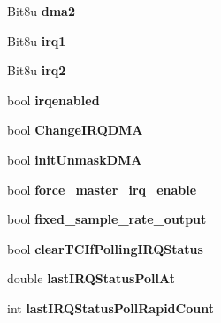 \begin{DoxyCompactItemize}
\item 
\hypertarget{structGFGus_a2c5b80f3d718d473666275ca05426004}{Bit8u {\bfseries dma2}}\label{structGFGus_a2c5b80f3d718d473666275ca05426004}

\item 
\hypertarget{structGFGus_a77dbee069455b135eb03cb0506ca7183}{Bit8u {\bfseries irq1}}\label{structGFGus_a77dbee069455b135eb03cb0506ca7183}

\item 
\hypertarget{structGFGus_aee8e865cfc001eee4b684a9f0aaf13c2}{Bit8u {\bfseries irq2}}\label{structGFGus_aee8e865cfc001eee4b684a9f0aaf13c2}

\item 
\hypertarget{structGFGus_a880603316b40656dcd6a0a66b31de0e1}{bool {\bfseries irqenabled}}\label{structGFGus_a880603316b40656dcd6a0a66b31de0e1}

\item 
\hypertarget{structGFGus_a886bb283bcdd3fed729cc9d0a227e215}{bool {\bfseries Change\-I\-R\-Q\-D\-M\-A}}\label{structGFGus_a886bb283bcdd3fed729cc9d0a227e215}

\item 
\hypertarget{structGFGus_addf5f696942ccec4aaee7c90fad1666f}{bool {\bfseries init\-Unmask\-D\-M\-A}}\label{structGFGus_addf5f696942ccec4aaee7c90fad1666f}

\item 
\hypertarget{structGFGus_a6f0abbfeda3210c8815df893b4050932}{bool {\bfseries force\-\_\-master\-\_\-irq\-\_\-enable}}\label{structGFGus_a6f0abbfeda3210c8815df893b4050932}

\item 
\hypertarget{structGFGus_ad2d7df4869b08f0d511c27c825f875c3}{bool {\bfseries fixed\-\_\-sample\-\_\-rate\-\_\-output}}\label{structGFGus_ad2d7df4869b08f0d511c27c825f875c3}

\item 
\hypertarget{structGFGus_a7f5277e4f45d370accfe2d3bead2bc4e}{bool {\bfseries clear\-T\-C\-If\-Polling\-I\-R\-Q\-Status}}\label{structGFGus_a7f5277e4f45d370accfe2d3bead2bc4e}

\item 
\hypertarget{structGFGus_af0b298312f809cdbee6142fde65bbe1c}{double {\bfseries last\-I\-R\-Q\-Status\-Poll\-At}}\label{structGFGus_af0b298312f809cdbee6142fde65bbe1c}

\item 
\hypertarget{structGFGus_a7cf53be90ec9d8dfb4b22b3e004fd9cd}{int {\bfseries last\-I\-R\-Q\-Status\-Poll\-Rapid\-Count}}\label{structGFGus_a7cf53be90ec9d8dfb4b22b3e004fd9cd}


\end{DoxyCompactItemize}
